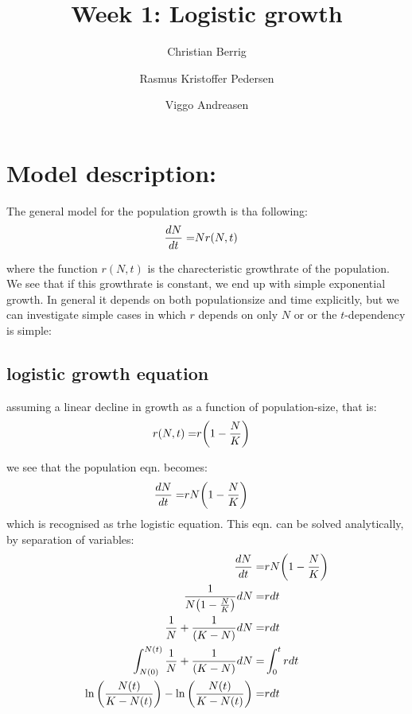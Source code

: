 \documentclass{article}
\author{Christian Berrig \and Rasmus Kristoffer Pedersen \and Viggo Andreasen}
\title{
Week 1: Logistic growth
}
\begin{document}
\maketitle


\section*{Model description:}
The general model for the population growth is tha following:
\begin{align*}
\dv{N}{t} =& N r(N, t)
\end{align*}

where the function $r(N,t)$ is the charecteristic growthrate of the population. 
We see that if this growthrate is constant, we end up with simple exponential growth. 
In general it depends on both populationsize and time explicitly, but we can investigate  simple cases in which $r$ depends on only $N$ or or the $t$-dependency is simple:

\subsection{logistic growth equation}
assuming a linear decline in growth as a function of population-size, that is:
\begin{align*}
r(N, t) =& r \qty(1 - \frac{N}{K})
\end{align*}

we see that the population eqn. becomes:
\begin{align*}
\dv{N}{t} =& r N \qty(1 - \frac{N}{K})
\end{align*}
which is recognised as trhe logistic equation.
This eqn. can be solved analytically, by separation of variables:
\begin{align*}
\dv{N}{t} =& r N \qty(1 - \frac{N}{K}) \\
\frac{1}{N \qty(1 - \frac{N}{K})} \dd N =& r \dd t \\
\frac{1}{N} + \frac{1}{\qty(K - N)} \dd N =& r \dd t \\
\int_{N(0)}^{N(t)} \frac{1}{N} + \frac{1}{\qty(K - N)} \dd N =& \int_{0}^{t} r \dd t \\
\ln\qty(\frac{N(t)}{K-N(t)}) - \ln\qty(\frac{N(t)}{K-N(t)})  =& r \dd t \\
\end{align*}
\end{document}
